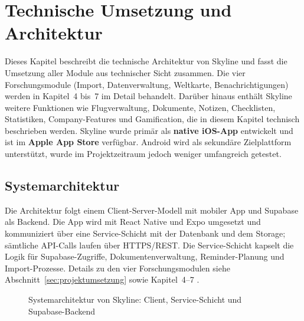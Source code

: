 \chapter{Technische Umsetzung und Architektur}\label{chapter:technik}
Dieses Kapitel beschreibt die technische Architektur von Skyline und fasst die
Umsetzung aller Module aus technischer Sicht zusammen. Die vier
Forschungsmodule (Import, Datenverwaltung, Weltkarte, Benachrichtigungen) werden
in Kapitel~4 bis~7 im Detail behandelt. Darüber hinaus enthält Skyline weitere
Funktionen wie Flugverwaltung, Dokumente, Notizen, Checklisten, Statistiken,
Company-Features und Gamification, die in diesem Kapitel technisch beschrieben
werden. Skyline wurde primär als \textbf{native iOS-App} entwickelt und ist im
\textbf{Apple App Store} verfügbar. Android wird als sekundäre Zielplattform
unterstützt, wurde im Projektzeitraum jedoch weniger umfangreich getestet.

\section{Systemarchitektur}
Die Architektur folgt einem Client-Server-Modell mit mobiler App und Supabase
als Backend. Die App wird mit React Native und Expo umgesetzt und kommuniziert
über eine Service-Schicht mit der Datenbank und dem Storage; sämtliche API-Calls
laufen über HTTPS/REST. Die Service-Schicht kapselt die Logik für Supabase-Zugriffe,
Dokumentenverwaltung, Reminder-Planung und Import-Prozesse. Details zu den vier
Forschungsmodulen siehe Abschnitt~\ref{sec:projektumsetzung} sowie Kapitel~4--7
\cite{supabasePlatform,reactNative,expoDocs}.

\begin{figure}[H]
  \centering
  \caption{Systemarchitektur von Skyline: Client, Service-Schicht und Supabase-Backend}
  \label{fig:architektur_technik}
\end{figure}
